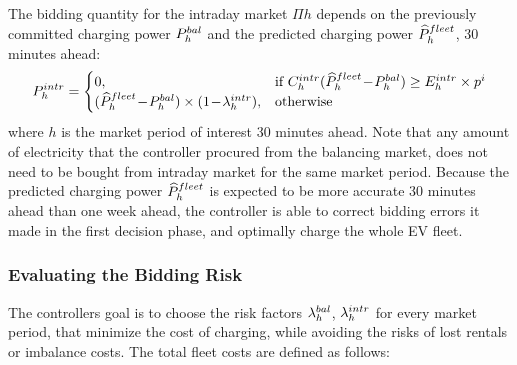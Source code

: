 \documentclass[a4paper, 12pt]{article}
\begin{document}
The bidding quantity for the intraday market \(\Pi{h}\) depends on the previously
committed charging power \(P^{bal}_{h}\) and the predicted charging power \(\widehat{P}^{fleet}_{h}\),
30 minutes ahead:
\begin{equation} \label{eq-model-pi}
  P^{intr}_{h}=
  \begin{cases}
    0, & \text{if}\ C^{intr}_{h}(\widehat{P}^{fleet}_{h}\!-\!P^{bal}_{h}) \geq E^{intr}_{h} \times p^{i}\\
    (\widehat{P}^{fleet}_{h}\!-\!P^{bal}_{h}) \times (1\!-\!\lambda^{intr}_{h}), & \text{otherwise}
  \end{cases}
\end{equation}
where \(h\) is the market period of interest 30 minutes ahead. Note that any
amount of electricity that the controller procured from the balancing market,
does not need to be bought from intraday market for the same market period.
Because the predicted charging power \(\widehat{P}^{fleet}_{h}\) is expected to be more
accurate 30 minutes ahead than one week ahead, the controller is able to correct
bidding errors it made in the first decision phase, and optimally charge the
whole EV fleet.

\subsubsection{Evaluating the Bidding Risk}
\label{sec:orgff7447a}
The controllers goal is to choose the risk factors \(\lambda^{bal}_{h}\), \(\lambda^{intr}_{h}\) for every
market period, that minimize the cost of charging, while avoiding the risks of
lost rentals or imbalance costs. The total fleet costs are defined as follows:
\end{document}
